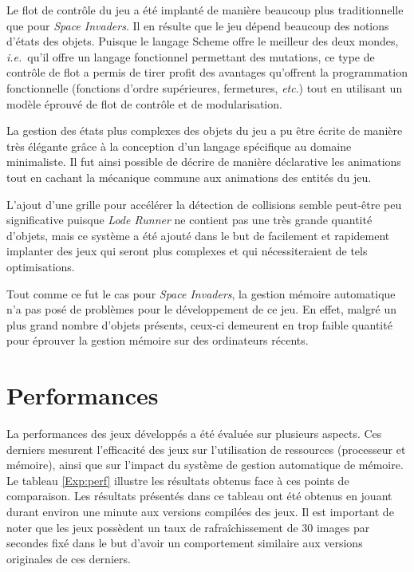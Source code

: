 \documentclass[12pt,twoside,letterpaper,francais]{book}
\newcommand{\ie}{{\textit{i.e.}~}}
\begin{document}
Le flot de contrôle du jeu a été implanté de manière beaucoup plus
traditionnelle que pour \textit{Space Invaders}. Il en résulte que le jeu dépend beaucoup
des notions d'états des objets. Puisque le langage Scheme offre
le meilleur des deux mondes, \ie qu'il offre un langage fonctionnel
permettant des mutations, ce type de contrôle de flot a permis de
tirer profit des avantages qu'offrent la programmation fonctionnelle
(fonctions d'ordre supérieures, fermetures, \textit{etc}.) tout en utilisant
un modèle éprouvé de flot de contrôle et de modularisation.

La gestion des états plus complexes des objets du jeu a pu être écrite
de manière très élégante grâce à la conception d'un langage spécifique
au domaine minimaliste. Il fut ainsi possible de décrire de manière
déclarative les animations tout en cachant la mécanique commune aux
animations des entités du jeu.

L'ajout d'une grille pour accélérer la détection de collisions semble
peut-être peu significative puisque \textit{Lode Runner} ne contient pas une très
grande quantité d'objets, mais ce système a été ajouté dans le but de
facilement et rapidement implanter des jeux qui seront plus complexes
et qui nécessiteraient de tels optimisations.

Tout comme ce fut le cas pour \textit{Space Invaders}, la gestion mémoire automatique n'a
pas posé de problèmes pour le dévelop\-pement de ce jeu. En effet,
malgré un plus grand nombre d'objets présents, ceux-ci demeurent en
trop faible quantité pour éprouver la gestion mémoire sur des
ordinateurs récents.

\FloatBarrier
\section{Performances}
La performances des jeux développés a été évaluée sur plusieurs
aspects. Ces derniers mesurent l'efficacité des jeux sur l'utilisation
de ressources (processeur et mémoire), ainsi que sur l'impact du
système de gestion automatique de mémoire. Le tableau \ref{Exp:perf}
illustre les résultats obtenus face à ces points de comparaison. Les
résultats présentés dans ce tableau ont été obtenus en jouant durant
environ une minute aux versions compilées des jeux. Il est important
de noter que les jeux possèdent un taux de rafraîchissement de 30
images par secondes fixé dans le but d'avoir un comportement similaire
aux versions originales de ces derniers.
\end{document}
